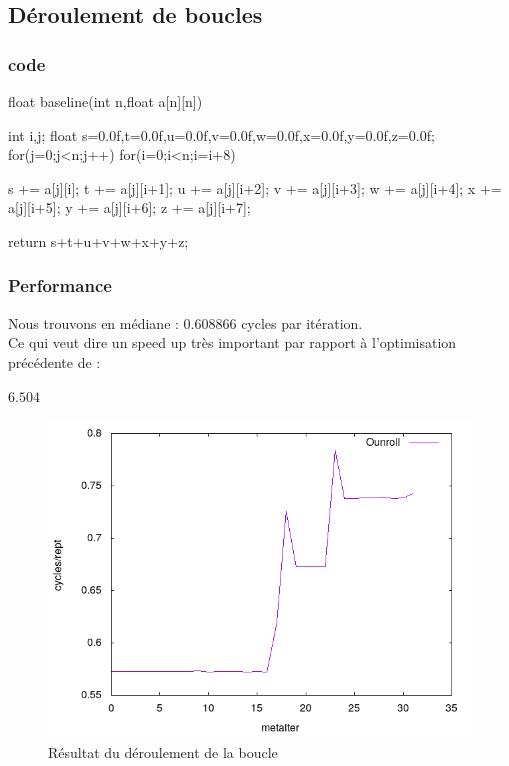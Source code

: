 \documentclass{report}
\begin{document}
  \subsection{Déroulement de boucles}
  \subsubsection{code}
  \begin{cc}
    float baseline(int n,float a[n][n])
    {
        int i,j;
        float s=0.0f,t=0.0f,u=0.0f,v=0.0f,w=0.0f,x=0.0f,y=0.0f,z=0.0f;
        for(j=0;j<n;j++)
        for(i=0;i<n;i=i+8)
        {
              s += a[j][i];
              t += a[j][i+1];
              u += a[j][i+2];
              v += a[j][i+3];
              w += a[j][i+4];
              x += a[j][i+5];
              y += a[j][i+6];
              z += a[j][i+7];

        }

        return s+t+u+v+w+x+y+z;
    }
  \end{cc}
  \subsubsection{Performance}
  Nous trouvons en médiane : $0.608866$ cycles par itération.\\
  Ce qui veut dire un speed up très important par rapport à l'optimisation précédente de :
  \begin{center}
      $6.504$
  \end{center}
  \begin{figure}[ht!]
    \centering
    \includegraphics[scale=0.45]{../metarep/Ounroll.png}
    \caption{Résultat du déroulement de la boucle}
  \end{figure}
\end{document}
